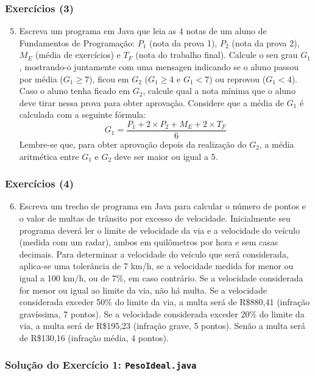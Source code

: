 \documentclass[xcolor={dvipsnames,table},aspectratio=169]{beamer}
\begin{document}
\begin{frame}\frametitle{Exercícios (3)}
\begin{enumerate}
	\setcounter{enumi}{4}
	\item Escreva um programa em Java que leia as 4 notas de um aluno de Fundamentos de Programação: $P_1$ (nota da prova 1), $P_2$ (nota da prova 2), $M_E$ (média de exercícios) e $T_F$ (nota do trabalho final). Calcule o seu grau $G_1$, mostrando-o juntamente com uma mensagen indicando se o aluno passou por média ($G_1 \ge 7$), ficou em $G_2$ ($G_1 \ge 4$ e $G_1 < 7$) ou reprovou ($G_1 < 4$). Caso o aluno tenha ficado em $G_2$, calcule qual a nota mínima que o aluno deve tirar nessa prova para obter aprovação. Considere que a média de $G_1$ é calculada com a seguinte fórmula:
\[ G_1 = \frac{P_1 + 2 \times P_2 + M_E + 2 \times T_F}{6} \]
Lembre-se que, para obter aprovação depois da realização do $G_2$, a média aritmética entre $G_1$ e $G_2$ deve ser maior ou igual a $5$.
\end{enumerate}
\end{frame}

\begin{frame}\frametitle{Exercícios (4)}
	\begin{enumerate}
	\setcounter{enumi}{5}
	\item Escreva um trecho de programa em Java para calcular o número de pontos e o valor de multas de trânsito por excesso de velocidade. Inicialmente seu programa deverá ler o limite de velocidade da via e a velocidade do veículo (medida com um radar), ambos em quilômetros por hora e sem casas decimais. Para determinar a velocidade do veículo que será considerada, aplica-se uma tolerância de 7 km/h, se a velocidade medida for menor ou igual a 100 km/h, ou de 7\%, em caso contrário. Se a velocidade considerada for menor ou igual ao limite da via, não há multa. Se a velocidade considerada exceder 50\% do limite da via, a multa será de R\$880,41 (infração gravíssima, 7 pontos). Se a velocidade considerada exceder 20\% do limite da via, a multa será de R\$195,23 (infração grave, 5 pontos). Senão a multa será de R\$130,16 (infração média, 4 pontos).
\end{enumerate}
\end{frame}

\begin{frame}[fragile]\frametitle{Solução do Exercício 1: \texttt{PesoIdeal.java}}
	\scriptsize{\inputminted[bgcolor=cyan!10]{java}{src/PesoIdeal.java}}
\end{frame}
\end{document}
